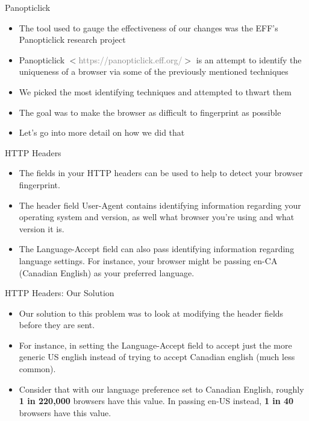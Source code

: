 \begin{frame}[fragile,t]{Panopticlick}
	\begin{itemize}
		\item The tool used to gauge the effectiveness of our changes was the EFF's Panopticlick research project
		\item Panopticlick $<$\textcolor{gray}{https://panopticlick.eff.org/}$>$ is an attempt to identify the uniqueness of a browser via some of the previously mentioned techniques
		\item We picked the most identifying techniques and attempted to thwart them
		\item The goal was to make the browser as difficult to fingerprint as possible
		\item Let's go into more detail on how we did that
	\end{itemize}
\end{frame}

\begin{frame}[fragile,t]{HTTP Headers}
	\begin{itemize}
		\item The fields in your HTTP headers can be used to help to detect your browser fingerprint.
		\item The header field User-Agent contains identifying information regarding your operating system and version, as well what browser you're using and what version it is.
		\item The Language-Accept field can also pass identifying information regarding language settings. For instance, your browser might be passing en-CA (Canadian English) as your preferred language.
	\end{itemize}
\end{frame}

\begin{frame}[fragile,t]{HTTP Headers: Our Solution}
	\begin{itemize}
		\item Our solution to this problem was to look at modifying the header fields before they are sent.
		\item For instance, in setting the Language-Accept field to accept just the more generic US english instead of trying to accept Canadian english (much less common).
		\item Consider that with our language preference set to Canadian English, roughly \textbf{1 in 220,000} browsers have this value. In passing en-US instead, \textbf{1 in 40} browsers have this value. 
	\end{itemize}
\end{frame}

